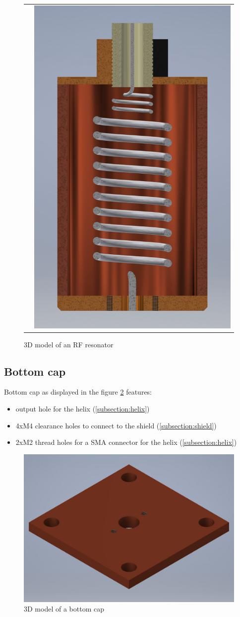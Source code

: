 \begin{figure}[h]
\begin{tabular}{c c}
		& 
		\includegraphics[width=.44\textwidth]{images/resonator_YZ_small}
	\end{tabular}
	\caption{3D model of an RF resonator}
	\label{fig:resonator}
\end{figure}

\clearpage
\subsection{Bottom cap}
\label{subsection:cap_bottom}
Bottom cap as displayed in the figure \ref{fig:cap_bottom} features:
\begin{itemize}
	\item output hole for the helix (\ref{subsection:helix})
	\item 4xM4 clearance holes to connect to the shield (\ref{subsection:shield})
	\item 2xM2 thread holes for a SMA connector for the helix (\ref{subsection:helix})
\end{itemize}

\begin{figure}[h]
	\centering
	\includegraphics[width=\textwidth]{images/cap_bottom_small}
	\caption{3D model of a bottom cap}
	\label{fig:cap_bottom}
\end{figure}

